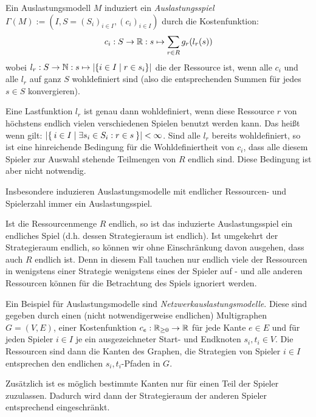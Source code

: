 \begin{defn}\label{def:Auslastungsspiel}
	Ein Auslastungsmodell $M$ induziert ein \emph{Auslastungsspiel} $\Gamma(M) := (I, S = (S_i)_{i\in I}, (c_i)_{i \in I})$ durch die Kostenfunktion:
	\[c_i: S \to \mathbb{R}: s \mapsto \sum_{r \in R} g_r(l_r(s)) \]
	wobei $l_r: S \to \mathbb{N}: s \mapsto \left|\{i\in I \mid r \in s_i\}\right|$ die der Ressource ist, wenn alle $c_i$ und alle $l_r$ auf ganz $S$ wohldefiniert sind (also die entsprechenden Summen für jedes $s \in S$ konvergieren).
\end{defn}

\begin{bem}
	Eine Lastfunktion $l_r$ ist genau dann wohldefiniert, wenn diese Ressource $r$ von höchstens endlich vielen verschiedenen Spielen benutzt werden kann. Das heißt wenn gilt: $\left|\Set{i \in I | \exists s_i \in S_i: r \in s}\right| < \infty$. Sind alle $l_r$ bereits wohldefiniert, so ist eine hinreichende Bedingung für die Wohldefiniertheit von $c_i$, dass alle diesem Spieler zur Auswahl stehende Teilmengen von $R$ endlich sind. Diese Bedingung ist aber nicht notwendig.
	
	Insbesondere induzieren Auslastungsmodelle mit endlicher Ressourcen- und Spielerzahl immer ein Auslastungsspiel.
	
	Ist die Ressourcenmenge $R$ endlich, so ist das induzierte Auslastungsspiel ein endliches Spiel (d.h. dessen Strategieraum ist endlich). Ist umgekehrt der Strategieraum endlich, so können wir ohne Einschränkung davon ausgehen, dass auch $R$ endlich ist. Denn in diesem Fall tauchen nur endlich viele der Ressourcen in wenigstens einer Strategie wenigstens eines der Spieler auf - und alle anderen Ressourcen können für die Betrachtung des Spiels ignoriert werden.
\end{bem}

\begin{bsp}
	Ein Beispiel für Auslastungsmodelle sind \emph{Netzwerkauslastungsmodelle}. Diese sind gegeben durch einen (nicht notwendigerweise endlichen) Multigraphen $G=(V,E)$, einer Kostenfunktion $c_e: \mathbb{R}_{\geq 0} \to \mathbb{R}$ für jede Kante $e \in E$ und für jeden Spieler $i \in I$ je ein ausgezeichneter Start- und Endknoten $s_i, t_i \in V$. Die Ressourcen sind dann die Kanten des Graphen, die Strategien von Spieler $i \in I$ entsprechen den endlichen $s_i,t_i$-Pfaden in $G$. 
	
	Zusätzlich ist es möglich bestimmte Kanten nur für einen Teil der Spieler zuzulassen. Dadurch wird dann der Strategieraum der anderen Spieler entsprechend eingeschränkt.
\end{bsp}

